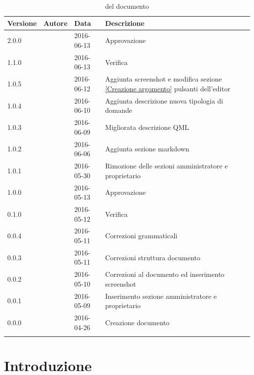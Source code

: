 \documentclass[12pt,a4paper]{article}
\begin{document}
	\begin{center}
		\begin{longtable}[H]{p{} p{} p{} p{}}
			\toprule
			\textbf{Versione}	&	\textbf{Autore}	&	\textbf{Data}	&	\textbf{Descrizione}\\*
			\midrule	
			\midrule
			2.0.0 & \AVE{} & 2016-06-13 & Approvazione \\*	
			\midrule
			1.1.0 & \AVI{} & 2016-06-13 & Verifica \\*
			\midrule
			1.0.5 & \AVE{} & 2016-06-12 & Aggiunta screenshot e modifica sezione \ref{Creazione argomento} pulsanti dell'editor\\*		
			\midrule
			1.0.4 & \TP{} & 2016-06-10 & Aggiunta descrizione nuova tipologia di domande \\*	
			\midrule
			1.0.3 & \TP{} & 2016-06-09 & Migliorata descrizione QML \\*	
			\midrule
			1.0.2 & \WS{} & 2016-06-06 &  Aggiunta sezione markdown \\*	
			\midrule	
			1.0.1 & \AB{} & 2016-05-30 &  Rimozione delle sezioni amministratore e proprietario\\*		
			\midrule
			1.0.0 & \AVE{} & 2016-05-13 &  Approvazione \\*			
			\midrule
			0.1.0 & \TP{} & 2016-05-12 &  Verifica \\*
			\midrule
			0.0.4 & \WS{} & 2016-05-11 &  Correzioni grammaticali \\*
			\midrule
			0.0.3 & \WS{} & 2016-05-11 &  Correzioni struttura documento \\*
			\midrule
			0.0.2 & \WS{} & 2016-05-10 &  Correzioni al documento ed inserimento screenshot \\*
			\midrule
			0.0.1 & \WS{} & 2016-05-09 &  Inserimento sezione amministratore e proprietario \\*
			\midrule
			0.0.0 & \AB{} & 2016-04-26 &  Creazione documento \\*
			\bottomrule
			\caption{\mGls{versionamento}  del documento}
			\label{tabVers1}
		\end{longtable}
	\end{center}
	
	\newpage
	\tableofcontents
	\newpage
	\listoftables
	\listoffigures
	\newpage
	
	
	\section{Introduzione}	\label{intro}
	
\end{document}
